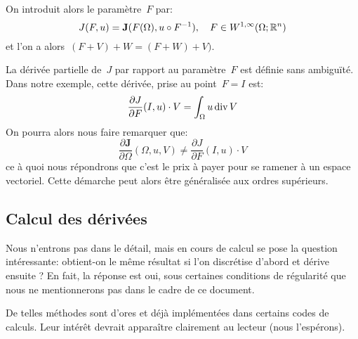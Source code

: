 \medskip
{}
On introduit alors le paramètre~$F$ par:
\begin{equation}
J(F,u)={\mathbf J}(F(\Omega),u\circ F^{-1}),\quad F\in W^{1,\infty}(\Omega;\mathbb R^n)
\end{equation}
et l'on a alors~$(F+V)+W=(F+W)+V)$.

La dérivée partielle de~$J$ par rapport au paramètre~$F$ est définie sans ambiguïté.
Dans notre exemple, cette dérivée, prise au point~$F=I$ est:
\begin{equation}
\dfrac{\partial J}{\partial F}(I,u)\cdot V = \displaystyle\int_\Omega u \operatorname{div} V
\end{equation}
On pourra alors nous faire remarquer que:
\begin{equation}
\dfrac{\partial{\mathbf J}}{\partial\Omega}(\Omega, u,V)
\ne
\dfrac{\partial J}{\partial F}(I,u)\cdot V
\end{equation}
ce à quoi nous répondrons que c'est le prix à payer pour se ramener à un espace
vectoriel.
Cette démarche peut alors être généralisée aux ordres supérieurs.

\medskip
\subsection{Calcul des dérivées}
Nous n'entrons pas dans le détail, mais en cours de calcul se pose la question intéressante: obtient-on le même résultat si l'on discrétise d'abord et dérive ensuite ? En fait, la réponse est oui, sous certaines conditions de régularité que nous ne mentionnerons pas dans le cadre de ce document.

\medskip
{}

De telles méthodes sont d'ores et déjà implémentées dans certains codes de calculs. Leur intérêt devrait apparaître clairement au lecteur (nous l'espérons).
